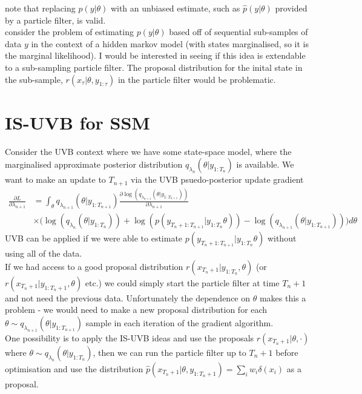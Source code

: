 \documentclass[
12pt, %
onehalfspacing, %
nohyperref, %
headsepline, %
chapterinoneline, %
]{MastersDoctoralThesis} %
\begin{document}
\citet{Gunawan2017} note that replacing $p(y | \theta)$ with an unbiased estimate, such as $\hat{p}(y | \theta)$ provided by a particle filter, is valid.
\\

\citet{Ma2017} consider the problem of estimating $p(y | \theta)$ based off of sequential sub-samples of data $y$ in the context of a hidden markov model (with states marginalised, so it is the marginal likelihood). I would be interested in seeing if this idea is extendable to a sub-sampling particle filter. The proposal distribution for the inital state in the sub-sample, $r(x_{\tau} | \theta, y_{1:\tau})$ in the particle filter would be problematic.
 
\section{IS-UVB for SSM}

Consider the UVB context where we have some state-space model, where the marginalised approximate posterior distribution $q_{\lambda_n}(\theta | y_{1:T_n})$ is available. We want to make an update to $T_{n+1}$ via the UVB psuedo-posterior update gradient
\begin{align}
\frac{\partial L}{\partial \lambda_{n+1}} &= \int_{\theta}q_{\lambda_{n+1}}(\theta | y_{1:T_{n+1}}) \frac{\partial \log(q_{\lambda_{n+1}}(\theta | y_{1:T_{n+1}}))}{\partial \lambda_{n+1}} \\
&\times \bigg(\log(q_{\lambda_n}(\theta | y_{1:T_{n}})) + \log(p(y_{T_{n}+1:T_{n+1}} | y_{1:T_n} \theta)) - \log(q_{\lambda_{n+1}}(\theta | y_{1:T_{n+1}})) \bigg) d\theta
\end{align}
UVB can be applied if we were able to estimate $p(y_{T_{n}+1:T_{n+1}} | y_{1:T_n} \theta)$ without using all of the data.
\\

If we had access to a good proposal distribution $r(x_{T_n+1} | y_{1:T_n}, \theta)$ (or $r(x_{T_n+1} | y_{1:T_n+1}, \theta)$ etc.) we could simply start the particle filter at time $T_n+1$ and not need the previous data. Unfortunately the dependence on $\theta$ makes this a problem - we would need to make a new proposal distribution for each $\theta \sim q_{\lambda_{n+1}}(\theta | y_{1:T_{n+1}})$ sample in each iteration of the gradient algorithm. 
\\

One possibility is to apply the IS-UVB ideas and use the proposals $r(x_{T_n+1} | \theta, \cdot)$ where $\theta \sim q_{\lambda_{n}}(\theta | y_{1:T_{n}})$, then we can run the particle filter up to $T_n+1$ before optimisation and use the distribution $\hat{p}(x_{T_n+1} | \theta, y_{1:T_{n}+1}) = \sum_i w_i \delta(x_i)$ as a proposal.
\\
\end{document}
